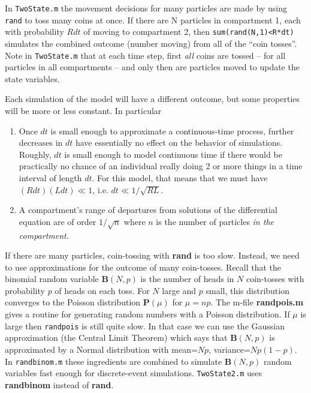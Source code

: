 \documentclass [11pt]{article}
\numberwithin{exercise}{section}
\begin{document}
In \texttt{TwoState.m} the movement decisions for many particles are made
by using \texttt{rand} to toss many coins at once. If there are N particles
in compartment 1, each with probability $Rdt$ of moving to compartment 2, then
\texttt{sum(rand(N,1)<R*dt)} simulates the combined outcome (number moving) from
all of the ``coin tosses''. Note in \texttt{TwoState.m}
that at each time step, first \textit{all} coins are tossed -- for all particles
in all compartments -- and only then are particles moved to update the state variables. 

Each simulation of the model will have a different outcome, but some 
properties will be more or less constant. In particular
\begin{enumerate}
\item{Once $dt$ is small enough to approximate a continuous-time process, 
further decreases in $dt$ have essentially no effect on the behavior of simulations. 
Roughly, $dt$ is small enough to model continuous time if there
would be practically no chance of an individual really doing 2 or more things in a  
time interval of length $dt$. For this model, that means that we must have
$(Rdt)(Ldt) \ll 1$, i.e. $dt \ll 1/\sqrt{RL}$.}
\item{A compartment's range of departures from solutions of the differential equation 
are of order $1/\sqrt{n}$ where $n$ is the number of particles
\textit{in the compartment}. }
\end{enumerate}

\vspace{-0.1in}
If there are many particles, coin-tossing with \textbf{rand} is too slow. Instead, we 
need to use approximations for the outcome of many coin-tosses. 
Recall that the binomial random variable $\mathbf{B}(N,p)$ is
the number of heads in $N$ coin-tosses with probability $p$ of heads on each
toss. For $N$ large and $p$ small, this distribution converges to the Poisson
distribution $\mathbf{P}(\mu)$ for $\mu=np$. The m-file \textbf{randpois.m} gives
a routine for generating random numbers with a Poisson distribution. If 
$\mu$ is large then \texttt{randpois} is still quite slow. In that case 
we can use the Gaussian approximation (the Central Limit Theorem)
which says that $\mathbf{B}(N,p)$ is approximated by a Normal distribution with
mean=$Np$, variance=$Np(1-p)$. In \texttt{randbinom.m} these ingredients are combined 
to simulate $\mathbf{B}(N,p)$ random variables fast enough for discrete-event simulations. 
\texttt{TwoState2.m} uses \textbf{randbinom} instead of \textbf{rand}. 
\end{document}
